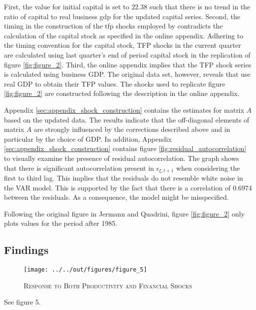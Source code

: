 First, the value for initial capital is set to $22.38$ such that there is no trend in the ratio of capital to real business gdp for the updated capital series. Second, the timing in the construction of the tfp shocks employed by \citeauthor{JERMANNfinancial} contradicts the calculation of the capital stock as specified in the online appendix. Adhering to the timing convention for the capital stock, TFP shocks in the current quarter are calculated using last quarter's end of period capital stock in the replication of figure \ref{fig:figure_2}. 
Third, the online appendix implies that the TFP shock series is calculated using business GDP. The original data set, however, reveals that \citeauthor{JERMANNfinancial} use real GDP to obtain their TFP values. The shocks used to replicate figure \ref{fig:figure_2} are constructed following the description in the online appendix. 

Appendix \ref{sec:appendix_shock_construction} contains the estimates for matrix $A$ based on the updated data. The results indicate that the off-diagonal elements of matrix $A$ are strongly influenced by the corrections described above and in particular by the choice of GDP. 
In addition, Appendix \ref{sec:appendix_shock_construction} contains figure \ref{fig:residual_autocorrelation} to visually examine the presence of residual autocorrelation.
The graph shows that there is significant autocorrelation present in ${\epsilon}_{\xi,t+1}$ when considering the first to third lag. This implies that the residuals do not resemble white noise in the VAR model. This is supported by the fact that there is a correlation of 0.6974 between the residuals. As a consequence, the model might be misspecified.

Following the original figure in Jermann and Quadrini, figure \ref{fig:figure_2} only plots values for the period after 1985.


\subsection{Findings}
\label{sec:findings}


\begin{figure}[t]
    
    \centering

    \texttt{[image: ../../out/figures/figure\_5]}

    \caption{\textsc{Response to Both Productivity and Financial Shocks}}
    
    \label{fig:figure_5}

\end{figure}

See figure 5.
